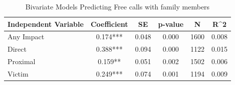 \begin{table}

\caption{\label{tab:tab:free_calls_bivariate}Bivariate Models Predicting Free calls with family members}
\centering
\begin{tabular}[t]{lccccc}
\toprule
Independent Variable & Coefficient & SE & p-value & N & R\textasciicircum{}2\\
\midrule
Any Impact & 0.174*** & 0.048 & 0.000 & 1600 & 0.008\\
Direct & 0.388*** & 0.094 & 0.000 & 1122 & 0.015\\
Proximal & 0.159** & 0.051 & 0.002 & 1502 & 0.006\\
Victim & 0.249*** & 0.074 & 0.001 & 1194 & 0.009\\
\bottomrule
\end{tabular}
\end{table}
